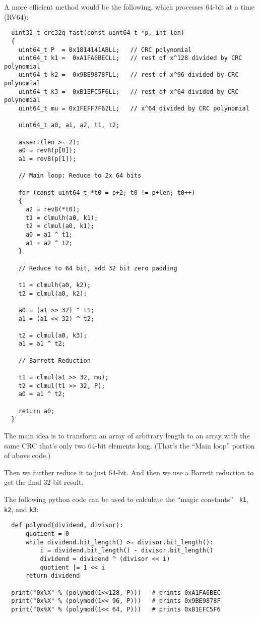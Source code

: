 A more efficient method would be the following, which processes 64-bit at a
time (RV64):

\begin{minipage}{\linewidth}
\begin{verbatim}
  uint32_t crc32q_fast(const uint64_t *p, int len)
  {
    uint64_t P  = 0x1814141ABLL;   // CRC polynomial
    uint64_t k1 =  0xA1FA6BECLL;   // rest of x^128 divided by CRC polynomial
    uint64_t k2 =  0x9BE9878FLL;   // rest of x^96 divided by CRC polynomial
    uint64_t k3 =  0xB1EFC5F6LL;   // rest of x^64 divided by CRC polynomial
    uint64_t mu = 0x1FEFF7F62LL;   // x^64 divided by CRC polynomial

    uint64_t a0, a1, a2, t1, t2;

    assert(len >= 2);
    a0 = rev8(p[0]);
    a1 = rev8(p[1]);

    // Main loop: Reduce to 2x 64 bits

    for (const uint64_t *t0 = p+2; t0 != p+len; t0++)
    {
      a2 = rev8(*t0);
      t1 = clmulh(a0, k1);
      t2 = clmul(a0, k1);
      a0 = a1 ^ t1;
      a1 = a2 ^ t2;
    }

    // Reduce to 64 bit, add 32 bit zero padding

    t1 = clmulh(a0, k2);
    t2 = clmul(a0, k2);

    a0 = (a1 >> 32) ^ t1;
    a1 = (a1 << 32) ^ t2;

    t2 = clmul(a0, k3);
    a1 = a1 ^ t2;

    // Barrett Reduction

    t1 = clmul(a1 >> 32, mu);
    t2 = clmul(t1 >> 32, P);
    a0 = a1 ^ t2;

    return a0;
  }
\end{verbatim}
\end{minipage}

The main idea is to transform an array of arbitrary length to an array with the
same CRC that's only two 64-bit elements long. (That's the ``Main loop''
portion of above code.)

Then we further reduce it to just 64-bit. And then we use a Barrett
reduction to get the final 32-bit result.

The following python code can be used to calculate the ``magic constants'' {\tt
k1}, {\tt k2}, and {\tt k3}:

\begin{minipage}{\linewidth}
\begin{verbatim}
  def polymod(dividend, divisor):
      quotient = 0
      while dividend.bit_length() >= divisor.bit_length():
          i = dividend.bit_length() - divisor.bit_length()
          dividend = dividend ^ (divisor << i)
          quotient |= 1 << i
      return dividend

  print("0x%X" % (polymod(1<<128, P)))   # prints 0xA1FA6BEC
  print("0x%X" % (polymod(1<< 96, P)))   # prints 0x9BE9878F
  print("0x%X" % (polymod(1<< 64, P)))   # prints 0xB1EFC5F6
\end{verbatim}
\end{minipage}

